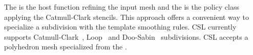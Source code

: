 \documentclass[letter,twocolumn]{article}
\begin{document}
\noindent The  
is the host function refining the input mesh
and the  is the policy 
class applying the Catmull-Clark stencils.
This approach offers a convenient way to
specialize a subdivision with the template smoothing rules.
CSL currently supports Catmull-Clark~\cite{cc}, 
Loop~\cite{loop} and Doo-Sabin~\cite{ds} subdivisions.
CSL accepts a polyhedron mesh specialized from the
\cgalpoly .  


{\footnotesize


}
\end{document}
